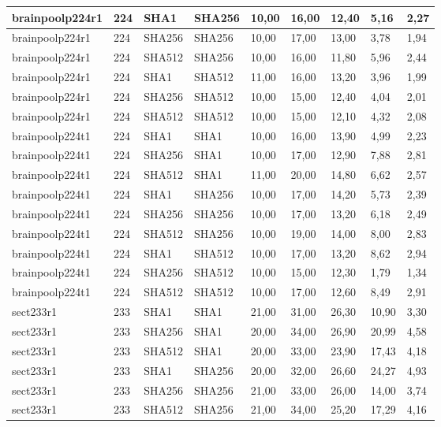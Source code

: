 \begin{longtable}{| l | l | l | l | l |l |l |l |l |}
brainpoolp224r1 & 224 & SHA1 & SHA256 & 10,00 & 16,00 & 12,40 & 5,16 & 2,27 \\ \hline 
brainpoolp224r1 & 224 & SHA256 & SHA256 & 10,00 & 17,00 & 13,00 & 3,78 & 1,94 \\ \hline 
brainpoolp224r1 & 224 & SHA512 & SHA256 & 10,00 & 16,00 & 11,80 & 5,96 & 2,44 \\ \hline 
brainpoolp224r1 & 224 & SHA1 & SHA512 & 11,00 & 16,00 & 13,20 & 3,96 & 1,99 \\ \hline 
brainpoolp224r1 & 224 & SHA256 & SHA512 & 10,00 & 15,00 & 12,40 & 4,04 & 2,01 \\ \hline 
brainpoolp224r1 & 224 & SHA512 & SHA512 & 10,00 & 15,00 & 12,10 & 4,32 & 2,08 \\ \hline 
brainpoolp224t1 & 224 & SHA1 & SHA1 & 10,00 & 16,00 & 13,90 & 4,99 & 2,23 \\ \hline 
brainpoolp224t1 & 224 & SHA256 & SHA1 & 10,00 & 17,00 & 12,90 & 7,88 & 2,81 \\ \hline 
brainpoolp224t1 & 224 & SHA512 & SHA1 & 11,00 & 20,00 & 14,80 & 6,62 & 2,57 \\ \hline 
brainpoolp224t1 & 224 & SHA1 & SHA256 & 10,00 & 17,00 & 14,20 & 5,73 & 2,39 \\ \hline 
brainpoolp224t1 & 224 & SHA256 & SHA256 & 10,00 & 17,00 & 13,20 & 6,18 & 2,49 \\ \hline 
brainpoolp224t1 & 224 & SHA512 & SHA256 & 10,00 & 19,00 & 14,00 & 8,00 & 2,83 \\ \hline 
brainpoolp224t1 & 224 & SHA1 & SHA512 & 10,00 & 17,00 & 13,20 & 8,62 & 2,94 \\ \hline 
brainpoolp224t1 & 224 & SHA256 & SHA512 & 10,00 & 15,00 & 12,30 & 1,79 & 1,34 \\ \hline 
brainpoolp224t1 & 224 & SHA512 & SHA512 & 10,00 & 17,00 & 12,60 & 8,49 & 2,91 \\ \hline 
sect233r1 & 233 & SHA1 & SHA1 & 21,00 & 31,00 & 26,30 & 10,90 & 3,30 \\ \hline 
sect233r1 & 233 & SHA256 & SHA1 & 20,00 & 34,00 & 26,90 & 20,99 & 4,58 \\ \hline 
sect233r1 & 233 & SHA512 & SHA1 & 20,00 & 33,00 & 23,90 & 17,43 & 4,18 \\ \hline 
sect233r1 & 233 & SHA1 & SHA256 & 20,00 & 32,00 & 26,60 & 24,27 & 4,93 \\ \hline 
sect233r1 & 233 & SHA256 & SHA256 & 21,00 & 33,00 & 26,00 & 14,00 & 3,74 \\ \hline 
sect233r1 & 233 & SHA512 & SHA256 & 21,00 & 34,00 & 25,20 & 17,29 & 4,16 \\ \hline 

\end{longtable}
